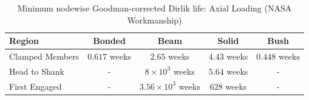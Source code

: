 \begin{table}[H]
    \centering
    \caption{Minimum nodewise Goodman-corrected Dirlik life: Axial Loading (NASA Workmanship)}
    \label{tab:MinLife_axial_nasa_nodewise_weeks}
    \begin{tabular}{lcccc}
        \toprule
        Region & Bonded & Beam & Solid & Bush \\
        \midrule
        Clamped Members & $0.617$ weeks & $2.65$ weeks & $4.43$ weeks & $0.448$ weeks \\
        Head to Shank & - & $8\times10^{3}$ weeks & $5.64$ weeks & - \\
        First Engaged & - & $3.56\times10^{3}$ weeks & $628$ weeks & - \\
        \bottomrule
    \end{tabular}
\end{table}
